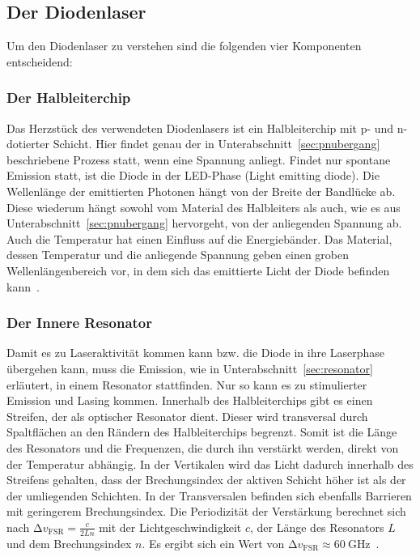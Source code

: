     \subsection{Der Diodenlaser}
    Um den Diodenlaser zu verstehen sind die folgenden vier Komponenten entscheidend:
    \subsubsection{Der Halbleiterchip}
    \label{sec:halbleiterchip}
    Das Herzstück des verwendeten Diodenlasers ist ein Halbleiterchip mit p- und n-dotierter Schicht. Hier findet genau der in Unterabschnitt~\ref{sec:pnubergang} beschriebene Prozess statt, wenn
    eine Spannung anliegt. Findet nur spontane Emission statt, ist die Diode in der LED-Phase (Light emitting diode). Die Wellenlänge der emittierten Photonen hängt von der Breite der 
    Bandlücke ab. Diese wiederum hängt sowohl vom Material des Halbleiters als auch, wie es aus Unterabschnitt~\ref{sec:pnubergang} hervorgeht, von der anliegenden Spannung ab. Auch die Temperatur 
    hat einen Einfluss auf die Energiebänder. 
    Das Material, dessen Temperatur und die anliegende Spannung geben einen groben Wellenlängenbereich vor, in dem sich das emittierte Licht der Diode befinden kann~\cite{V60}. 
    \subsubsection{Der Innere Resonator}
    Damit es zu Laseraktivität kommen kann bzw. die Diode in ihre Laserphase übergehen kann, muss die Emission, wie in Unterabschnitt~\ref{sec:resonator} erläutert, in einem Resonator 
    stattfinden. Nur so kann es zu stimulierter Emission und Lasing kommen. Innerhalb des Halbleiterchips gibt es einen Streifen, der als optischer Resonator dient.
    Dieser wird transversal durch Spaltflächen an den Rändern des Halbleiterchips begrenzt. Somit ist die Länge des Resonators und die Frequenzen, die durch ihn
    verstärkt werden, direkt von der Temperatur abhängig. In der Vertikalen wird das Licht dadurch innerhalb des Streifens gehalten, dass der Brechungsindex der aktiven Schicht höher ist als der 
    der umliegenden Schichten. In der Transversalen befinden sich ebenfalls Barrieren mit geringerem Brechungsindex. Die Periodizität der Verstärkung berechnet sich nach $\increment v_{\mathrm{FSR}}=\frac{c}{2Ln}$
    mit der Lichtgeschwindigkeit $c$, der Länge des Resonators $L$ und dem Brechungsindex $n$. Es ergibt sich ein Wert von $\increment v_{\mathrm{FSR}}\approx \qty{60}{\giga\hertz}$~\cite{V60}. 
    \label{sec:internalcavity}
